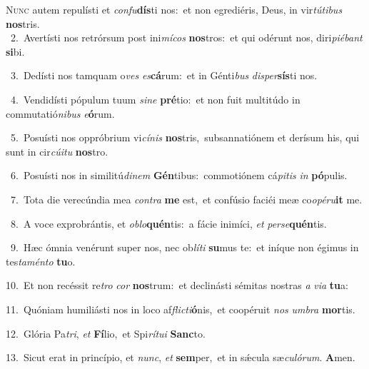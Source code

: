 \lettrine{\initial\textcolor{\initialcolor}{N}}{unc} autem repulísti et \textit{con}\-\textit{fu}\textbf{dís}ti nos:~\star et non egrediéris, Deus, in vir\-\textit{tú}\-\textit{ti}\textit{bus} \textbf{nos}\-tris.\\
{\numbfont\textcolor{\numbcolor}{~2.}}~Avertísti nos retrórsum post ini\-\textit{mí}\-\textit{cos} \textbf{nos}\-tros:~\star et qui odérunt nos, diri\-\textit{pi}\-\textit{é}\textit{bant} \textbf{si}\-bi.\par
{\numbfont\textcolor{\numbcolor}{~3.}}~Dedísti nos tamquam o\textit{ves} \textit{es}\-\textbf{cá}rum:~\star et in Génti\textit{bus} \textit{di}\-\textit{sper}\textbf{sís}ti nos.\par
{\numbfont\textcolor{\numbcolor}{~4.}}~Vendidísti pópulum tuum \textit{si}\-\textit{ne} \textbf{pré}\-tio:~\star et non fuit multitúdo in commutatió\-\textit{ni}\-\textit{bus} \textit{e}\-\textbf{ó}rum.\par
{\numbfont\textcolor{\numbcolor}{~5.}}~Posuísti nos oppróbrium vi\-\textit{cí}\-\textit{nis} \textbf{nos}\-tris,~\star subsannatiónem et derísum his, qui sunt in cir\-\textit{cú}\-\textit{i}\textit{tu} \textbf{nos}\-tro.\par
{\numbfont\textcolor{\numbcolor}{~6.}}~Posuísti nos in similitú\-\textit{di}\-\textit{nem} \textbf{Gén}\-tibus:~\star commotiónem cá\-\textit{pi}\-\textit{tis} \textit{in} \textbf{pó}\-pulis.\par
{\numbfont\textcolor{\numbcolor}{~7.}}~Tota die verecúndia mea \textit{con}\-\textit{tra} \textbf{me} est,~\star et confúsio faciéi meæ co\-\textit{o}\-\textit{pé}\textit{ru}\textbf{it} me.\par
{\numbfont\textcolor{\numbcolor}{~8.}}~A voce exprobrántis, et \textit{ob}\-\textit{lo}\textbf{quén}tis:~\star a fácie inimíci, \textit{et} \textit{per}\-\textit{se}\textbf{quén}tis.\par
{\numbfont\textcolor{\numbcolor}{~9.}}~Hæc ómnia venérunt super nos, nec ob\-\textit{lí}\-\textit{ti} \textbf{su}\-mus te:~\star et iníque non égimus in tes\-\textit{ta}\-\textit{mén}\textit{to} \textbf{tu}\-o.\par
{\numbfont\textcolor{\numbcolor}{10.}}~Et non recéssit re\textit{tro} \textit{cor} \textbf{nos}\-trum:~\star et declinásti sémitas nostras \textit{a} \textit{vi}\-\textit{a} \textbf{tu}\-a:\par
{\numbfont\textcolor{\numbcolor}{11.}}~Quóniam humiliásti nos in loco af\-\textit{flic}\-\textit{ti}\textbf{ó}nis,~\star et coopéruit \textit{nos} \textit{um}\-\textit{bra} \textbf{mor}\-tis.\par
{\numbfont\textcolor{\numbcolor}{12.}}~Glória Pa\-\textit{tri}\-, \textit{et} \textbf{Fí}\-lio,~\star et Spi\-\textit{rí}\-\textit{tu}\textit{i} \textbf{Sanc}\-to.\par
{\numbfont\textcolor{\numbcolor}{13.}}~Sicut erat in princípio, et \textit{nunc}\-, \textit{et} \textbf{sem}\-per,~\star et in sǽcula sæ\-\textit{cu}\-\textit{ló}\textit{rum}. \textbf{A}\-men.\par
